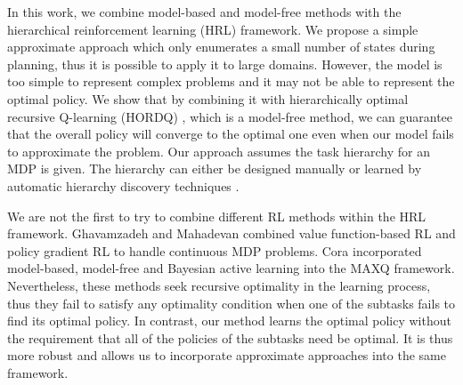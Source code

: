 In this work, we combine model-based and model-free methods with the hierarchical 
reinforcement learning (HRL) framework. We propose a simple approximate approach which 
only enumerates a small number of states during planning, thus it is possible to apply it to large 
domains. 
However, the model is too simple to represent complex problems and it may not be able to represent the 
optimal policy. We show that by combining it with 
hierarchically optimal recursive Q-learning (HORDQ) \cite{HORDQ}, which is a model-free method, we can 
guarantee that the overall policy will converge to the optimal one even when our model
fails to approximate the problem. Our approach assumes the task hierarchy for an MDP is given. The hierarchy can either be 
designed manually or learned by automatic hierarchy discovery techniques \cite{HexQ}.



We are not the first to try to combine different RL methods within the HRL framework.  
Ghavamzadeh and Mahadevan \cite{HybridPolicy} combined value function-based RL and policy gradient RL to handle
continuous MDP problems. Cora \cite{Vlad} incorporated model-based, model-free and Bayesian active learning into the MAXQ framework.
Nevertheless, these methods seek recursive optimality in the learning process, 
thus they fail to satisfy any optimality condition when one of the subtasks
fails to find its optimal policy.
In contrast, our method learns the optimal policy without the requirement that 
all of the policies of the subtasks need be optimal. It is thus more robust and allows us to incorporate approximate
approaches into the same framework.





